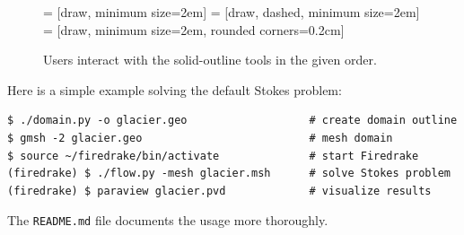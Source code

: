 \documentclass[letterpaper,final,12pt,reqno]{amsart}
\begin{document}
\begin{figure}[h]
\bigskip
{} = [draw, minimum size=2em]
 = [draw, dashed, minimum size=2em]
 = [draw, minimum size=2em, rounded corners=0.2cm]

\medskip
\caption{Users interact with the solid-outline tools in the given order.}
\label{fig:blockdiagram}
\end{figure}

Here is a simple example solving the default Stokes problem:

\medskip
\begin{Verbatim}
$ ./domain.py -o glacier.geo                   # create domain outline
$ gmsh -2 glacier.geo                          # mesh domain
$ source ~/firedrake/bin/activate              # start Firedrake
(firedrake) $ ./flow.py -mesh glacier.msh      # solve Stokes problem
(firedrake) $ paraview glacier.pvd             # visualize results
\end{Verbatim}

\medskip
\noindent The \verb|README.md| file documents the usage more thoroughly.


\small

\bigskip


\end{document}
